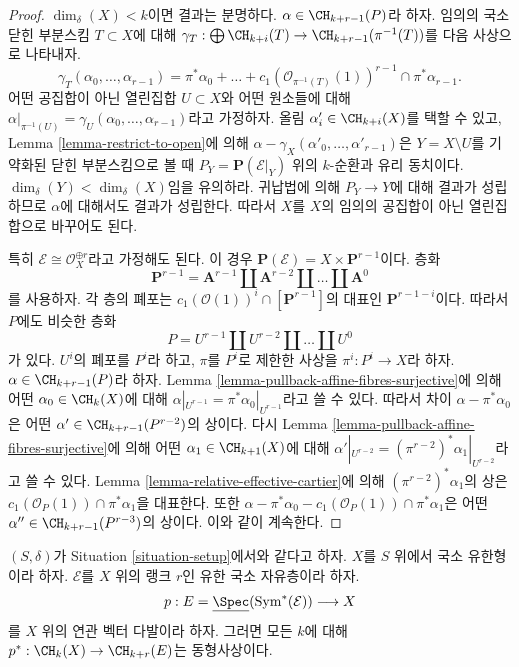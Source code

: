 \begin{proof}
\medskip\noindent
$\dim_\delta(X) < k$이면 결과는 분명하다.
$\alpha \in \CH_{k + r - 1}(P)$라 하자. 임의의 국소 닫힌 부분스킴
$T \subset X$에 대해
$\gamma_T : \bigoplus \CH_{k + i}(T) \to \CH_{k + r - 1}(\pi^{-1}(T))$를
다음 사상으로 나타내자.
$$
\gamma_T(\alpha_0, \ldots, \alpha_{r - 1})
= \pi^*\alpha_0 + \ldots +
c_1(\mathcal{O}_{\pi^{-1}(T)}(1))^{r - 1} \cap \pi^*\alpha_{r - 1}.
$$
어떤 공집합이 아닌 열린집합 $U \subset X$와 어떤 원소들에 대해
$\alpha|_{\pi^{-1}(U)} = \gamma_U(\alpha_0, \ldots, \alpha_{r - 1})$라고
가정하자. 올림 $\alpha'_i \in \CH_{k + i}(X)$를 택할 수 있고,
Lemma \ref{lemma-restrict-to-open}에 의해
$\alpha - \gamma_X(\alpha'_0, \ldots, \alpha'_{r - 1})$은
$Y = X \setminus U$를 기약화된 닫힌 부분스킴으로 볼 때
$P_Y = \mathbf{P}(\mathcal{E}|_Y)$ 위의 $k$-순환과 유리 동치이다.
$\dim_\delta(Y) < \dim_\delta(X)$임을 유의하라. 귀납법에 의해
$P_Y \to Y$에 대해 결과가 성립하므로 $\alpha$에 대해서도 결과가
성립한다. 따라서 $X$를 $X$의 임의의 공집합이 아닌 열린집합으로 바꾸어도
된다.

\medskip\noindent
특히 $\mathcal{E} \cong \mathcal{O}_X^{\oplus r}$라고 가정해도 된다.
이 경우 $\mathbf{P}(\mathcal{E}) = X \times \mathbf{P}^{r - 1}$이다.
층화
$$
\mathbf{P}^{r - 1} = \mathbf{A}^{r - 1}
\amalg \mathbf{A}^{r - 2}
\amalg \ldots
\amalg \mathbf{A}^0
$$
를 사용하자. 각 층의 폐포는
$c_1(\mathcal{O}(1))^i \cap [\mathbf{P}^{r - 1}]$의 대표인
$\mathbf{P}^{r - 1 - i}$이다. 따라서 $P$에도 비슷한 층화
$$
P = U^{r - 1} \amalg U^{r - 2} \amalg \ldots \amalg U^0
$$
가 있다. $U^i$의 폐포를 $P^i$라 하고, $\pi$를 $P^i$로 제한한 사상을
$\pi^i : P^i \to X$라 하자. $\alpha \in \CH_{k + r - 1}(P)$라 하자.
Lemma \ref{lemma-pullback-affine-fibres-surjective}에 의해 어떤
$\alpha_0 \in \CH_k(X)$에 대해
$\alpha|_{U^{r - 1}} = \pi^*\alpha_0|_{U^{r - 1}}$라고 쓸 수 있다.
따라서 차이 $\alpha - \pi^*\alpha_0$은 어떤
$\alpha' \in \CH_{k + r - 1}(P^{r - 2})$의 상이다. 다시 Lemma
\ref{lemma-pullback-affine-fibres-surjective}에 의해 어떤
$\alpha_1 \in \CH_{k + 1}(X)$에 대해
$\alpha'|_{U^{r - 2}} = (\pi^{r - 2})^*\alpha_1|_{U^{r - 2}}$라고 쓸 수
있다. Lemma \ref{lemma-relative-effective-cartier}에 의해
$(\pi^{r - 2})^*\alpha_1$의 상은
$c_1(\mathcal{O}_P(1)) \cap \pi^*\alpha_1$을 대표한다. 또한
$\alpha - \pi^*\alpha_0 - c_1(\mathcal{O}_P(1)) \cap \pi^*\alpha_1$은
어떤 $\alpha'' \in \CH_{k + r - 1}(P^{r - 3})$의 상이다. 이와 같이
계속한다.
\end{proof}

\begin{lemma}
\label{lemma-vectorbundle}
$(S, \delta)$가 Situation \ref{situation-setup}에서와 같다고 하자.
$X$를 $S$ 위에서 국소 유한형이라 하자. $\mathcal{E}$를 $X$ 위의 랭크
$r$인 유한 국소 자유층이라 하자.
$$
p :
E = \underline{\Spec}(\text{Sym}^*(\mathcal{E}))
\longrightarrow
X
$$
를 $X$ 위의 연관 벡터 다발이라 하자. 그러면 모든 $k$에 대해
$p^* : \CH_k(X) \to \CH_{k + r}(E)$는 동형사상이다.
\end{lemma}

